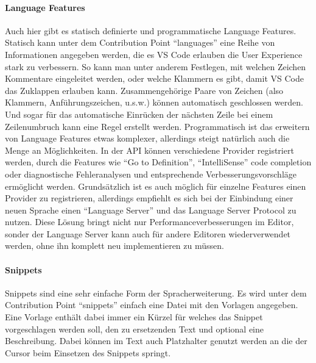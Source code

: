   \paragraph{Language Features}
  Auch hier gibt es statisch definierte und programmatische Language Features.
  Statisch kann unter dem Contribution Point \enquote{languages} eine Reihe von Informationen angegeben werden,
  die es VS Code erlauben die User Experience stark zu verbessern. So kann man unter anderem Festlegen,
  mit welchen Zeichen Kommentare eingeleitet werden, oder welche Klammern es gibt, damit VS Code das Zuklappen erlauben kann.
  Zusammengehörige Paare von Zeichen (also Klammern, Anführungszeichen, u.s.w.) können automatisch geschlossen werden.
  Und sogar für das automatische Einrücken der nächsten Zeile bei einem Zeilenumbruch kann eine Regel erstellt werden.
  Programmatisch ist das erweitern von Language Features etwas komplexer, allerdings steigt natürlich auch die
  Menge an Möglichkeiten. In der API können verschiedene Provider registriert werden, durch die Features wie
  \enquote{Go to Definition}, \enquote{IntelliSense} code completion oder diagnostische Fehleranalysen und
  entsprechende Verbesserungsvorschläge ermöglicht werden. Grundsätzlich ist es auch möglich für einzelne
  Features einen Provider zu registrieren, allerdings empfiehlt es sich bei der Einbindung einer neuen
  Sprache einen \enquote{Language Server} und das Language Server Protocol zu nutzen. Diese Lösung
  bringt nicht nur Performanceverbesserungen im Editor, sonder der Language Server kann auch für 
  andere Editoren wiederverwendet werden, ohne ihn komplett neu implementieren zu müssen.
  \paragraph{Snippets}
  Snippets sind eine sehr einfache Form der Spracherweiterung. Es wird unter dem Contribution Point
  \enquote{snippets} einfach eine Datei mit den Vorlagen angegeben. Eine Vorlage enthält dabei immer
  ein Kürzel für welches das Snippet vorgeschlagen werden soll, den zu ersetzenden Text und optional
  eine Beschreibung. Dabei können im Text auch Platzhalter genutzt werden an die der Cursor beim Einsetzen
  des Snippets springt.
